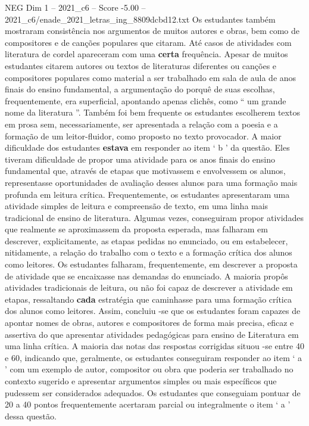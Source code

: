 \begin{textsample}{NEG Dim 1 – 2021\_c6 – Score -5.00 – 2021\_c6/enade\_2021\_letras\_ing\_8809dcbd12.txt}
Os estudantes também mostraram consistência nos argumentos de muitos autores e obras, bem como de compositores e de canções populares que citaram.
Até casos de atividades com literatura de cordel apareceram com uma \textbf{certa} frequência.
Apesar de muitos estudantes citarem autores ou textos de literaturas diferentes ou canções e compositores populares como material a ser trabalhado em sala de aula de anos finais do ensino fundamental, a argumentação do porquê de suas escolhas, frequentemente, era superficial, apontando apenas clichês, como “ um grande nome da literatura ”.
Também foi bem frequente os estudantes escolherem textos em prosa sem, necessariamente, ser apresentada a relação com a poesia e a formação de um leitor-fluidor, como proposto no texto provocador.
A maior dificuldade dos estudantes \textbf{estava} em responder ao item ‘ b ’ da questão.
Eles tiveram dificuldade de propor uma atividade para os anos finais do ensino fundamental que, através de etapas que motivassem e envolvessem os alunos, representasse oportunidades de avaliação desses alunos para uma formação mais profunda em leitura crítica.
Frequentemente, os estudantes apresentaram uma atividade simples de leitura e compreensão de texto, em uma linha mais tradicional de ensino de literatura.
Algumas vezes, conseguiram propor atividades que realmente se aproximassem da proposta esperada, mas falharam em descrever, explicitamente, as etapas pedidas no enunciado, ou em estabelecer, nitidamente, a relação do trabalho com o texto e a formação crítica dos alunos como leitores.
Os estudantes falharam, frequentemente, em descrever a proposta de atividade que se encaixasse nas demandas do enunciado.
A maioria propôs atividades tradicionais de leitura, ou não foi capaz de descrever a atividade em etapas, ressaltando \textbf{cada} estratégia que caminhasse para uma formação crítica dos alunos como leitores.
Assim, concluiu -se que os estudantes foram capazes de apontar nomes de obras, autores e compositores de forma mais precisa, eficaz e assertiva do que apresentar atividades pedagógicas para ensino de Literatura em uma linha crítica.
A maioria das notas das respostas corrigidas situou -se entre 40 e 60, indicando que, geralmente, os estudantes conseguiram responder ao item ‘ a ’ com um exemplo de autor, compositor ou obra que poderia ser trabalhado no contexto sugerido e apresentar argumentos simples ou mais específicos que pudessem ser considerados adequados.
Os estudantes que conseguiam pontuar de 20 a 40 pontos frequentemente acertaram parcial ou integralmente o item ‘ a ’ dessa questão.

\end{textsample}
